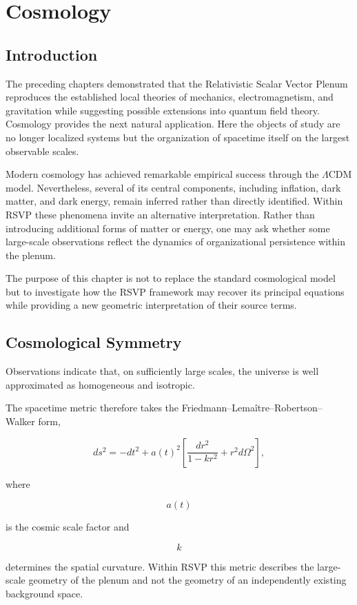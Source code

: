 \documentclass[11pt,oneside]{book}
\numberwithin{equation}{chapter}
\theoremstyle{definition}
\theoremstyle{plain}
\begin{document}
\chapter{Cosmology}

\section{Introduction}

The preceding chapters demonstrated that the Relativistic Scalar Vector
Plenum reproduces the established local theories of mechanics,
electromagnetism, and gravitation while suggesting possible extensions into
quantum field theory. Cosmology provides the next natural application. Here
the objects of study are no longer localized systems but the organization of
spacetime itself on the largest observable scales.

Modern cosmology has achieved remarkable empirical success through the
\(\Lambda\)CDM model. Nevertheless, several of its central
components, including inflation, dark matter, and dark energy, remain
inferred rather than directly identified. Within RSVP these phenomena invite
an alternative interpretation. Rather than introducing additional forms of
matter or energy, one may ask whether some large-scale observations reflect
the dynamics of organizational persistence within the plenum.

The purpose of this chapter is not to replace the standard cosmological
model but to investigate how the RSVP framework may recover its principal
equations while providing a new geometric interpretation of their source
terms.

\section{Cosmological Symmetry}

Observations indicate that, on sufficiently large scales, the universe is
well approximated as homogeneous and isotropic.

The spacetime metric therefore takes the Friedmann--Lema\^itre--Robertson--
Walker form,

\[
ds^2
=
-dt^2
+
a(t)^2
\left[
\frac{dr^2}{1-kr^2}
+
r^2d\Omega^2
\right],
\]

where

\[
a(t)
\]

is the cosmic scale factor and

\[
k
\]

determines the spatial curvature. Within RSVP this metric describes the large-scale geometry of the plenum and not the geometry of an independently existing background space.
\end{document}

